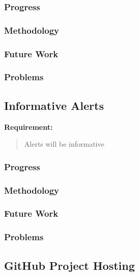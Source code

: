 \documentclass[draftclsnofoot,onecolumn]{IEEEtran}
\begin{document}
\subsubsection{Progress}

\subsubsection{Methodology}

\subsubsection{Future Work}

\subsubsection{Problems}






\subsection{Informative Alerts}

\textbf{Requirement:}

\begin{quote}

Alerts will be informative

\end{quote}

\subsubsection{Progress}

\subsubsection{Methodology}

\subsubsection{Future Work}

\subsubsection{Problems}






\subsection{GitHub Project Hosting}
\end{document}

